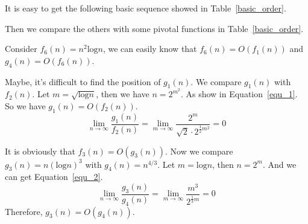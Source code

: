 {
    It is easy to get the following basic sequence showed in Table~\ref{basic_order}.

\begin{table}[H]
\caption{Part of the ranking}
\label{basic_order}
\centering
{}
\end{table}

Then we compare the others with some pivotal functions in Table~\ref{basic_order}.

Consider $f_6(n)=n^2\textrm{log} n$, we can easily know that $f_6(n) = O(f_1(n))$ and $g_4(n)=O(f_6(n))$.

Maybe, it's difficult to find the position of $g_1(n)$. We compare $g_1(n)$ with $f_2(n)$. Let $m=\sqrt{\textrm{log} n}$, then we have $n=2^{m^2}$. As show in Equation~\ref{equ_1}. So we have $g_1(n)=O(f_2(n))$.
\begin{equation}\label{equ_1}
  \lim\limits_{n \to \infty} \frac{g_1(n)}{f_2(n)}  = \lim\limits_{m \to \infty} \frac{2^m}{\sqrt{2}\cdot 2^{\frac{1}{2}m^2}} = 0
\end{equation}

It is obviously that $f_3(n)=O(g_3(n))$. Now we compare $g_3(n)=n(\textrm{log} n)^3$ with $g_4(n)=n^{4/3}$. Let $m=\textrm{log} n$, then $n=2^m$. And we can get Equation~\ref{equ_2}.
\begin{equation}\label{equ_2}
  \lim\limits_{n \to \infty} \frac{g_3(n)}{g_4(n)}  = \lim\limits_{m \to \infty} \frac{m^3}{2^{\frac{1}{3}m}} = 0
\end{equation}
Therefore, $g_3(n)=O(g_4(n))$.

}
